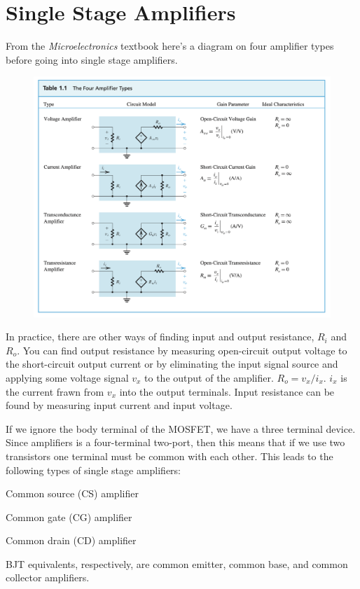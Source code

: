 \chapter{Single Stage Amplifiers}
From the \textit{Microelectronics} textbook here's a diagram on four amplifier types before going into single stage amplifiers.
\begin{figure}[H]
    \centering
    \includegraphics[scale=0.6]{figs/ch06/amplifier_types.png}
\end{figure}
In practice, there are other ways of finding input and output resistance, $R_i$ and $R_o$. You can find output resistance by measuring open-circuit output voltage to the short-circuit output current or by eliminating the input signal source and applying some voltage signal $v_x$ to the output of the amplifier. $R_o = v_x \slash i_x$. $i_x$ is the current frawn from $v_x$ into the output terminals. Input resistance can be found by measuring input current and input voltage.

If we ignore the body terminal of the MOSFET, we have a three terminal device. Since amplifiers is a four-terminal two-port, then this means that if we use two transistors one terminal must be common with each other. This leads to the following types of single stage amplifiers:
\begin{pline}
    \item Common source (CS) amplifier
    \item Common gate (CG) amplifier 
    \item Common drain (CD) amplifier
\end{pline}
BJT equivalents, respectively, are common emitter, common base, and common collector amplifiers. 

